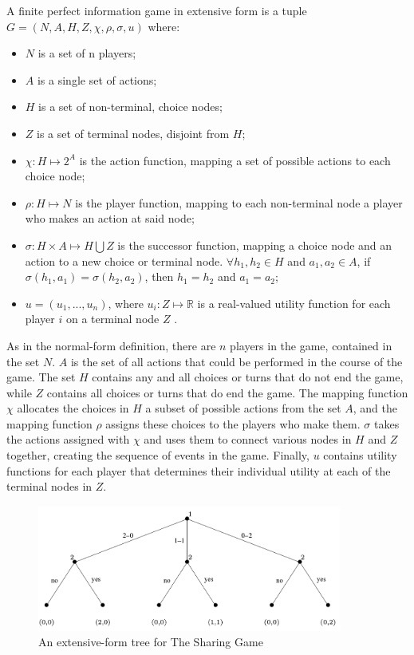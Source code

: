 \begin{define}
  A finite perfect information game in extensive form is a tuple $G = (N, A, H, Z, \chi, \rho, \sigma, u)$ where:
  \begin{itemize}
  \item $N$ is a set of n players;
  \item $A$ is a single set of actions;
  \item $H$ is a set of non-terminal, choice nodes;
  \item $Z$ is a set of terminal nodes, disjoint from $H$;
  \item $\chi: H\mapsto 2^A$ is the action function, mapping a set of possible actions to each choice node;
  \item $\rho: H\mapsto N$ is the player function, mapping to each non-terminal node a player who makes an action at said node;
  \item $\sigma: H\times A\mapsto H\bigcup Z$ is the successor function, mapping a choice node and an action to a new choice or terminal node. $\forall h_1, h_2\in H$ and $a_1, a_2\in A$, if $\sigma(h_1, a_1)=\sigma(h_2, a_2)$, then $h_1=h_2$ and $a_1=a_2$;
  \item $u=(u_1,...,u_n)$, where $u_i:Z\mapsto \mathbb{R}$ is a real-valued utility function for each player $i$ on a terminal node $Z$ \cite{shoh09}.
  \end{itemize}
\end{define}

As in the normal-form definition, there are $n$ players in the game, contained in the set $N$. $A$ is the set of all actions that could be performed in the course of the game. The set $H$ contains any and all choices or turns that do not end the game, while $Z$ contains all choices or turns that do end the game. The mapping function $\chi$ allocates the choices in $H$ a subset of possible actions from the set $A$, and the mapping function $\rho$ assigns these choices to the players who make them. $\sigma$ takes the actions assigned with $\chi$ and uses them to connect various nodes in $H$ and $Z$ together, creating the sequence of events in the game. Finally, $u$ contains utility functions for each player that determines their individual utility at each of the terminal nodes in $Z$.\\

\begin{figure}[H]
  \centering
  \includegraphics[width=10cm]{figures/ExampleTree.png}
  \caption{An extensive-form tree for The Sharing Game \cite{shoh09}}
  \label{fig:sharingTree}
\end{figure}

